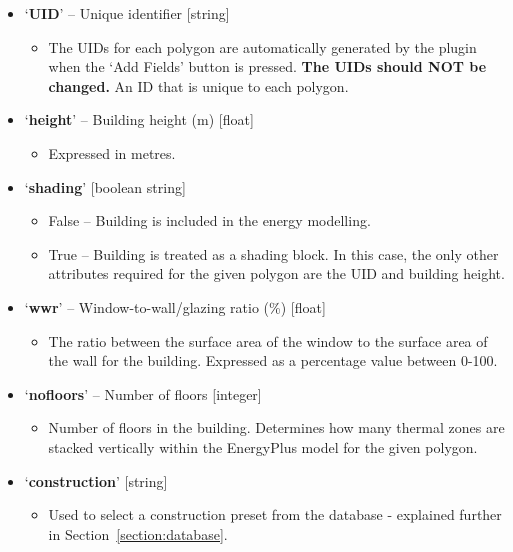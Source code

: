 \documentclass{article}
\begin{document}
\begin{itemize}
    \item `\textbf{UID}' -- {Unique identifier} [string]
    \begin{itemize}
        \item The UIDs for each polygon are automatically generated by the plugin when the `Add Fields' button is pressed. \textbf{The UIDs should NOT be changed.} An ID that is unique to each polygon.%
    \end{itemize}
    \item `\textbf{height}' -- {Building height (m)} [float]
    \begin{itemize}
        \item Expressed in metres.
    \end{itemize}
    \item `\textbf{shading}' [boolean string]
    \begin{itemize}
        \item False -- Building is included in the energy modelling.
        \item True -- Building is treated as a shading block. In this case, the only other attributes required for the given polygon are the UID and building height.
    \end{itemize}
    \item `\textbf{wwr}' -- {Window-to-wall/glazing ratio} (\%) [float]
    \begin{itemize}
        \item The ratio between the surface area of the window to the surface area of the wall for the building. Expressed as a percentage value between 0-100.
    \end{itemize}
    \item `\textbf{nofloors}' -- {Number of floors} [integer]
    \begin{itemize}
        \item Number of floors in the building. Determines how many thermal zones are stacked vertically within the EnergyPlus model for the given polygon.
    \end{itemize}
    \item `\textbf{construction}' [string]
    \begin{itemize}
        \item Used to select a construction preset from the database - explained further in Section~\ref{section:database}.

\end{itemize}
\end{itemize}
\end{document}
